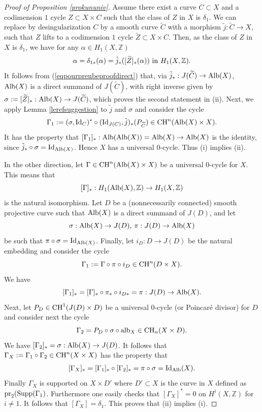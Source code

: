 \documentclass[10pt]{article}
\begin{document}
\begin{proof}[Proof of Proposition \ref{prokununiv}] Assume there exist a  curve $C\subset X$ and a codimension $1$ cycle $Z\subset X\times C$ such that the class of $Z$ in $X$ is $\delta_1$. We can replace by desingularization  $C$ by a smooth curve $\widetilde{C}$ with a morphism $\tilde{j}:\widetilde{C}\rightarrow X$, such that $Z$ lifts to a codimension $1$ cycle $\widetilde{Z}\subset X\times C$. Then, as the class of $Z$ in $X$ is $\delta_{1}$, we have for any $\alpha\in H_1(X,\mathbb{Z})$
\begin{eqnarray}\label{eqpourpreubeproofdirect} \alpha=\delta_{1*}(\alpha)=\tilde{j}_*([\widetilde{Z}]_*(\alpha))\,\,{\rm in}\,\,H_1(X,\mathbb{Z}).
\end{eqnarray}
It follows from (\ref{eqpourpreubeproofdirect}) that, via $\tilde{j}_*:J(\widetilde{C})\rightarrow {\rm Alb}(X)$, ${\rm Alb}(X)$ is a direct summand of $J(\widetilde{C})$, with right  inverse given by $ \sigma:=[\widetilde{Z}]_*:{\rm Alb}(X)\rightarrow J(\widetilde{C})$, which proves the second statement in (ii).
Next, we apply Lemma \ref{lerefsuggestion} to $\tilde{j}$ and $\sigma$ and consider
 the cycle
$$ \Gamma_1:= (\sigma,{\rm Id}_C)^*\circ({\rm Id}_{J(C)},\tilde{j})_*(P_{\widetilde{C}})\in {\rm CH}^n({\rm Alb}(X)\times X ).$$
It has the property that $[\Gamma_{1}]_*:{\rm Alb}({\rm Alb}(X))={\rm Alb}(X)\rightarrow {\rm Alb}(X)$ is the identity, since $\tilde{j}_*\circ \sigma={\rm Id}_{{\rm Alb}(X)}$. Hence $X$ has a universal $0$-cycle. Thus (i) implies (ii).




 In the other direction, let $\Gamma\in {\rm CH}^n( {\rm Alb}(X)\times X)$ be a universal $0$-cycle for $X$. This means that
$$[\Gamma]_*:H_1({\rm Alb}(X),\mathbb{Z})\rightarrow  H_1(X,\mathbb{Z})$$
is the natural isomorphism. Let $D$ be a (nonnecessarily connected) smooth projective  curve such that ${\rm Alb}(X)$   is a direct summand of $J(D)$, and let $$\sigma: {\rm Alb}(X)\rightarrow J(D),\,\pi:J(D)\rightarrow {\rm Alb}(X)$$ be such that $\pi\circ \sigma={\rm Id}_{{\rm Alb}(X)}$. Finally, let $i_D: D\rightarrow J(D)$ be the natural embedding and
consider the cycle
$$\Gamma_1:=    \Gamma\circ \pi\circ i_D\in{\rm CH}^n(D\times X).$$
We have $$[\Gamma_1]_*=[\Gamma]_*\circ \pi_*\circ i_{D*}=\pi: J(D)\rightarrow {\rm Alb}(X).$$
 Next, let $P_D\in {\rm CH}^1( J(D)\times D)$ be a universal $0$-cycle (or Poincar\'{e} divisor) for $D$ and consider next the cycle
$$\Gamma_2=P_D\circ \sigma \circ {\rm alb}_X\in {\rm CH}_n(X\times D).$$
We have
$[\Gamma_2]_*=\sigma:{\rm Alb}(X)\rightarrow J(D)$. It follows that
$\Gamma_X:=\Gamma_1\circ \Gamma_2\in {\rm CH}^n(X\times X)$
has the property that
\begin{eqnarray}\label{eqinversefacteur} [\Gamma_X]_*=[\Gamma_1]_*\circ [\Gamma_2]_*=\pi\circ \sigma={\rm Id}_{\rm Alb}(X).\end{eqnarray}
Finally $\Gamma_X$ is supported on $X\times D'$ where $D'\subset X$ is the curve in $X$ defined as ${\rm pr}_2({\rm Supp}(\Gamma_1)$. Furthermore one easily checks that $[\Gamma_X]^*=0$ on $H^i(X,\mathbb{Z})$ for $i\not =1$. It follows that $[\Gamma_X]=\delta_1$.
This proves that (ii) implies (i).


\end{proof}
\end{document}
